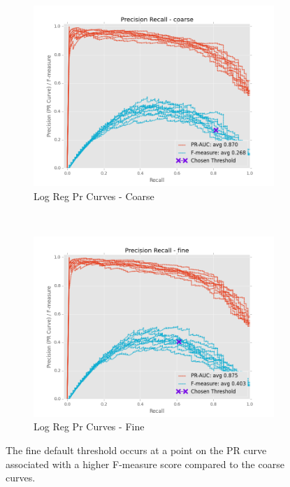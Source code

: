 \documentclass[ms]{nuthesis}
\begin{document}
\FloatBarrier
\begin{figure}[!htb]
    \centering
    \begin{subfigure}[t]{0.5\textwidth}
        \centering
        \includegraphics[width=\textwidth]{fig/LogReg_FindThreshold_PrCurve_coarse}
        \caption{Log Reg Pr Curves - Coarse}
    \end{subfigure}%
    ~
    \begin{subfigure}[t]{0.5\textwidth}
        \centering
        \includegraphics[width=\textwidth]{fig/LogReg_FindThreshold_PrCurve_fine}
        \caption{Log Reg Pr Curves - Fine}
    \end{subfigure}
    \caption{The fine default threshold occurs at a point on the PR curve associated with a higher
    F-measure score compared to the coarse curves.}
    \label{fig:LogRegThreshPr}
\end{figure}
\FloatBarrier
\end{document}
